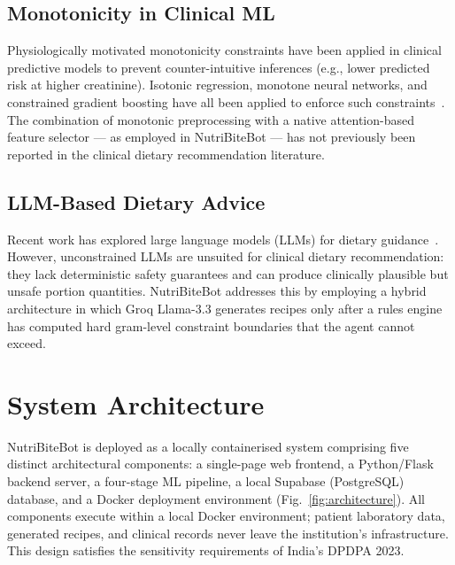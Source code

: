 \documentclass[journal]{IEEEtran}
\begin{document}
\subsection{Monotonicity in Clinical ML}
Physiologically motivated monotonicity constraints have been applied in
clinical predictive models to prevent counter-intuitive inferences (e.g.,
lower predicted risk at higher creatinine). Isotonic regression,
monotone neural networks, and constrained gradient boosting have all been
applied to enforce such constraints~\cite{gupta2019}. The combination of
monotonic preprocessing with a native attention-based feature selector
--- as employed in NutriBiteBot --- has not previously been reported in
the clinical dietary recommendation literature.

\subsection{LLM-Based Dietary Advice}
Recent work has explored large language models (LLMs) for dietary
guidance~\cite{xu2024llm}. However, unconstrained LLMs are unsuited for
clinical dietary recommendation: they lack deterministic safety guarantees
and can produce clinically plausible but unsafe portion quantities.
NutriBiteBot addresses this by employing a hybrid architecture in which
Groq Llama-3.3 generates recipes only after a rules engine has
computed hard gram-level constraint boundaries that the agent cannot
exceed.

\section{System Architecture}
\label{sec:architecture}

NutriBiteBot is deployed as a locally containerised system comprising
five distinct architectural components: a single-page web frontend, a
Python/Flask backend server, a four-stage ML pipeline, a local Supabase
(PostgreSQL) database, and a Docker deployment environment
(Fig.~\ref{fig:architecture}). All components execute within a local
Docker environment; patient laboratory data, generated recipes, and
clinical records never leave the institution's infrastructure. This
design satisfies the sensitivity requirements of India's DPDPA 2023.
\end{document}
